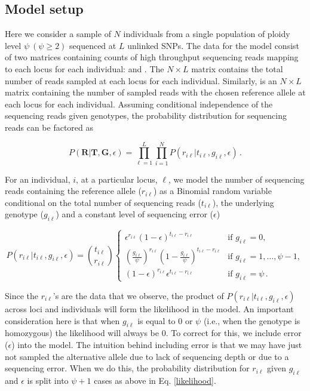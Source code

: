 \documentclass[11pt,english,letterpaper,oneside]{article}
\begin{document}
\subsection*{Model setup}
\medskip

Here we consider a sample of $N$ individuals from a single population of ploidy level $\psi\: (\psi\geq2)$ sequenced at $L$ unlinked SNPs. The data for the model consist of two matrices containing counts of high throughput sequencing reads mapping to each locus for each individual: \tmat{} and \rmat. The $N\times L$ matrix \tmat{} contains the total number of reads sampled at each locus for each individual. Similarly, \rmat{} is an $N\times L$ matrix containing the number of sampled reads with the chosen reference allele at each locus for each individual. Assuming conditional independence of the sequencing reads given genotypes, the probability distribution for sequencing reads can be factored as

\begin{equation}\label{factored_lik}
P(\bm{R}|\bm{T},\bm{G}, \epsilon) = \displaystyle\prod_{\ell=1}^L\displaystyle\prod_{i=1}^N P(r_{i \ell}|t_{i \ell},g_{i \ell}, \epsilon)\,.
\end{equation}

\noindent For an individual, $i$, at a particular locus, $\ell$, we model the number of sequencing reads containing the reference allele ($r_{i\ell}$) as a Binomial random variable conditional on the total number of sequencing reads ($t_{i\ell} $), the underlying genotype ($g_{i\ell}$) and a constant level of sequencing error ($\epsilon$)

\begin{equation}\label{likelihood}
P(r_{i \ell}|t_{i\ell}, g_{i \ell},\epsilon) = \binom{t_{i \ell}}{r_{i \ell}}
	\begin{cases}
	\epsilon^{r_{i \ell}}(1-\epsilon)^{t_{i \ell}-r_{i \ell}} & \text{if  } g_{i \ell} = 0, \\[0.05in]
	\left(\frac{g_{i \ell}}{\psi}\right)^{r_{i \ell}}\left(1-\frac{g_{i \ell}}{\psi}\right)^{t_{i \ell}-r_{i \ell}} & \text{if  } g_{i \ell} = 1,\ldots,\psi-1, \\[0.05in]
	(1-\epsilon)^{r_{i \ell}}\epsilon^{t_{i \ell}-r_{i \ell}} & \text{if  } g_{i \ell} = \psi\,.
	\end{cases}
\end{equation}


\noindent Since the $r_{i \ell}$'s are the data that we observe, the product of $P(r_{i \ell}|t_{i\ell}, g_{i \ell},\epsilon)$ across loci and individuals will form the likelihood in the model. An important consideration here is that when $g_{i \ell}$ is equal to 0 or $\psi$ (i.e., when the genotype is homozygous) the likelihood will always be 0. To correct for this, we include error ($\epsilon$) into the model. The intuition behind including error is that we may have just not sampled the alternative allele due to lack of sequencing depth or due to a sequencing error. When we do this, the probability distribution for $r_{i\ell}$ given $g_{i\ell}$ and $\epsilon$ is split into $\psi+1$ cases as above in Eq. \ref{likelihood}.
\medskip
\end{document}
